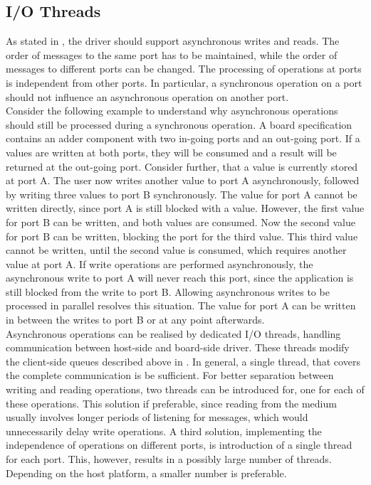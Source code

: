 \documentclass{report}
\begin{document}
\subsection{I/O Threads}
\label{sec:arch:threads}
As stated in , %
the driver should support asynchronous writes and reads. The order of messages to the same port has to be maintained, while the order of messages to different ports can be changed. The processing of operations at ports is independent from other ports. In particular, a synchronous operation on a port should not influence an asynchronous operation on another port.\\
Consider the following example to understand why asynchronous operations should still be processed during a synchronous operation. A board specification contains an adder component with two in-going ports and an out-going port. If a values are written at both ports, they will be consumed and a result will be returned at the out-going port. Consider further, that a value is currently stored at port A. The user now writes another value to port A asynchronously, followed by writing three values to port B synchronously. The value for port A cannot be written directly, since port A is still blocked with a value. However, the first value for port B can be written, and both values are consumed. Now the second value for port B can be written, blocking the port for the third value. This third value cannot be written, until the second value is consumed, which requires another value at port A. If write operations are performed asynchronously, the asynchronous write to port A will never reach this port, since the application is still blocked from the write to port B. Allowing asynchronous writes to be processed in parallel resolves this situation. The value for port A can be written in between the writes to port B or at any point afterwards.\\

Asynchronous operations can be realised by dedicated I/O threads, handling communication between host-side and board-side driver. These threads modify the client-side queues described above in . In general, a single thread, that covers the complete communication is be sufficient. For better separation between writing and reading operations, two threads can be introduced for, one for each of these operations. This solution if preferable, since reading from the medium usually involves longer periods of listening for messages, which would unnecessarily delay write operations. A third solution, implementing the independence of operations on different ports, is introduction of a single thread for each port. This, however, results in a possibly large number of threads. Depending on the host platform, a smaller number is preferable.
\end{document}
